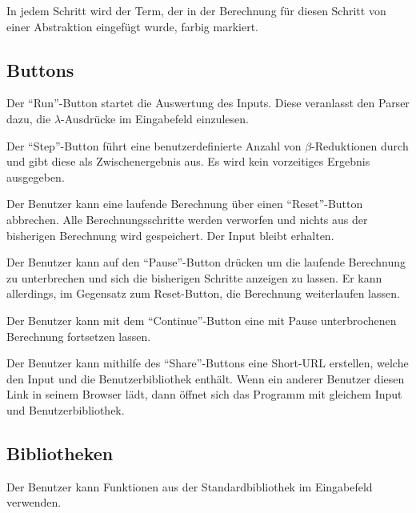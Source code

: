 \documentclass[parskip=full,11pt,twoside]{scrartcl}
\begin{document}
In jedem Schritt wird der Term, der in der Berechnung für diesen Schritt von einer Abstraktion eingefügt wurde, farbig markiert.


\subsection{Buttons}

Der \enquote{Run}-Button startet die Auswertung des Inputs. Diese veranlasst den Parser dazu, die $\lambda$-Ausdrücke im Eingabefeld einzulesen.

Der \enquote {Step}-Button führt eine benutzerdefinierte Anzahl von $\beta$-Reduktionen durch und gibt diese als Zwischenergebnis aus. Es wird kein vorzeitiges Ergebnis ausgegeben.

Der Benutzer kann eine laufende Berechnung über einen \enquote{Reset}-Button abbrechen. Alle Berechnungsschritte werden verworfen und nichts aus der bisherigen Berechnung wird gespeichert. Der Input bleibt erhalten.

Der Benutzer kann auf den \enquote{Pause}-Button drücken um die laufende Berechnung zu unterbrechen und sich die bisherigen Schritte anzeigen zu lassen. Er kann allerdings, im Gegensatz zum Reset-Button, die Berechnung weiterlaufen lassen.

Der Benutzer kann mit dem \enquote{Continue}-Button eine mit Pause unterbrochenen Berechnung fortsetzen lassen.

Der Benutzer kann mithilfe des  \enquote{Share}-Buttons eine Short-URL erstellen, welche den Input und die Benutzerbibliothek enthält. Wenn ein anderer Benutzer diesen Link in seinem Browser lädt, dann öffnet sich das Programm mit gleichem Input und Benutzerbibliothek.

\subsection{Bibliotheken}

Der Benutzer kann Funktionen aus der Standardbibliothek im Eingabefeld verwenden.
\end{document}
